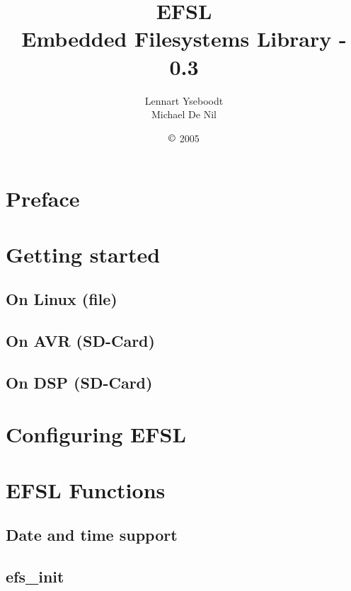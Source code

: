 \documentclass[a4paper,fleqn]{article}
\begin{document}
\title{\Huge{EFSL}\\\Large{Embedded Filesystems Library - 0.3}}
\author{Lennart Yseboodt\\Michael De Nil}
\date{$\copyright$ 2005}
\maketitle

\newpage
\tableofcontents

\setlength{\parindent}{0pt}
\setlength{\parskip}{1ex plus 0.5ex minus 0.2ex}

\newpage
\section{Preface}


\newpage
\section{Getting started}
\subsection{On Linux (file)}
	
\newpage
\subsection{On AVR (SD-Card)}
	
\newpage
\subsection{On DSP (SD-Card)}
	

\newpage
\section{Configuring EFSL}
	
	
\newpage
\section{EFSL Functions}
\subsection{Date and time support}
	
	\newpage
\subsection{efs\_init}
	
	\newpage
\end{document}

